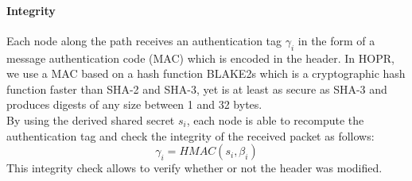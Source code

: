 \paragraph{Integrity}
Each node along the path receives an authentication tag $\gamma_i$ in the form of a message authentication code (MAC)
which is encoded in the header. In HOPR, we use a MAC based on a hash function BLAKE2s which is a cryptographic hash function faster than SHA-2 and SHA-3, yet is at least as secure as SHA-3 and produces digests of any size between 1 and 32 bytes. 
\\By using the derived shared secret $s_i$, each node is able to recompute the authentication tag and check the integrity of the received packet as follows: $$\gamma_i=HMAC(s_i,\beta_i)$$
This integrity check allows to verify whether or not the header was modified.










